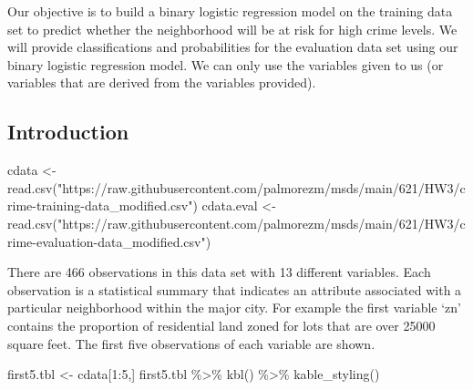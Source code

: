 \documentclass[
]{article}
\newenvironment{Shaded}{\begin{snugshade}}{\end{snugshade}}
\newcommand{\DecValTok}[1]{\textcolor[rgb]{0.00,0.00,0.81}{#1}}
\newcommand{\FunctionTok}[1]{\textcolor[rgb]{0.00,0.00,0.00}{#1}}
\newcommand{\NormalTok}[1]{#1}
\newcommand{\OtherTok}[1]{\textcolor[rgb]{0.56,0.35,0.01}{#1}}
\newcommand{\SpecialCharTok}[1]{\textcolor[rgb]{0.00,0.00,0.00}{#1}}
\newcommand{\StringTok}[1]{\textcolor[rgb]{0.31,0.60,0.02}{#1}}
\begin{document}
Our objective is to build a binary logistic regression model on the
training data set to predict whether the neighborhood will be at risk
for high crime levels. We will provide classifications and probabilities
for the evaluation data set using our binary logistic regression model.
We can only use the variables given to us (or variables that are derived
from the variables provided).

\hypertarget{introduction}{%
\subsection{Introduction}\label{introduction}}

\begin{Shaded}
\begin{Highlighting}[]
\NormalTok{cdata }\OtherTok{\textless{}{-}} \FunctionTok{read.csv}\NormalTok{(}\StringTok{"https://raw.githubusercontent.com/palmorezm/msds/main/621/HW3/crime{-}training{-}data\_modified.csv"}\NormalTok{)}
\NormalTok{cdata.eval }\OtherTok{\textless{}{-}} \FunctionTok{read.csv}\NormalTok{(}\StringTok{"https://raw.githubusercontent.com/palmorezm/msds/main/621/HW3/crime{-}evaluation{-}data\_modified.csv"}\NormalTok{)}
\end{Highlighting}
\end{Shaded}

There are 466 observations in this data set with 13 different variables.
Each observation is a statistical summary that indicates an attribute
associated with a particular neighborhood within the major city. For
example the first variable `zn' contains the proportion of residential
land zoned for lots that are over 25000 square feet. The first five
observations of each variable are shown.

\begin{Shaded}
\begin{Highlighting}[]
\NormalTok{first5.tbl }\OtherTok{\textless{}{-}}\NormalTok{ cdata[}\DecValTok{1}\SpecialCharTok{:}\DecValTok{5}\NormalTok{,]}
\NormalTok{first5.tbl }\SpecialCharTok{\%\textgreater{}\%}
  \FunctionTok{kbl}\NormalTok{() }\SpecialCharTok{\%\textgreater{}\%}
  \FunctionTok{kable\_styling}\NormalTok{()}
\end{Highlighting}
\end{Shaded}
\end{document}
